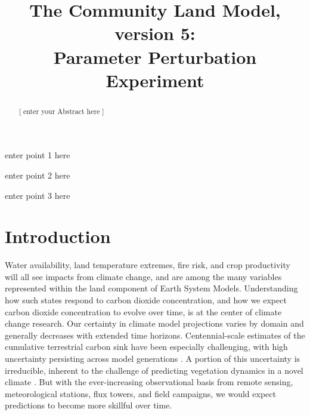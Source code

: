 \documentclass[draft]{agujournal2019}
\begin{document}
\title{The Community Land Model, version 5: \\ Parameter Perturbation Experiment}













\begin{keypoints}
\item enter point 1 here
\item enter point 2 here
\item enter point 3 here
\end{keypoints}



\begin{abstract}
[ enter your Abstract here ]
\end{abstract}







\section{Introduction}

Water availability, land temperature extremes, fire risk, and crop productivity will all see impacts from climate change, and are among the many variables represented within the land component of Earth System Models.
Understanding how such states respond to carbon dioxide concentration, and how we expect carbon dioxide concentration to evolve over time, is at the center of climate change research.  
Our certainty in climate model projections varies by domain and generally decreases with extended time horizons.
Centennial-scale estimates of the cumulative terrestrial carbon sink have been especially challenging, with high uncertainty persisting across model generations \cite{friedlingstein2014,arora2020}. 
A portion of this uncertainty is irreducible, inherent to the challenge of predicting vegetation dynamics in a novel climate \cite{bonan2018}.
But with the ever-increasing observational basis from remote sensing, meteorological stations, flux towers, and field campaigns, we would expect predictions to become more skillful over time.
\end{document}

